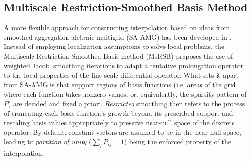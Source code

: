\subsection{Multiscale Restriction-Smoothed Basis Method}
\label{subsec:related_work_msrsb}

A more flexible approach for constructing interpolation based on ideas from smoothed aggregation alebraic multigrid (SA-AMG) has been developed in \cite{Moyner2016}.   Instead of employing localization assumptions to solve local problems, the Multiscale Restriction-Smoothed Basis method (MsRSB) proposes the use of weighted Jacobi smoothing iterations to adapt a tentative prolongation operator to the local properties of the fine-scale differential operator.   What sets it apart from SA-AMG is that support regions of basis functions (i.e. areas of the grid where each function takes nonzero values, or, equivalently, the sparsity pattern of $P$) are decided and fixed a priori. \textit{Restricted} smoothing then refers to the process of truncating each basis function's growth beyond its prescribed support and rescaling basis values appropriately to preserve near-null space of the discrete operator.   By default, constant vectors are assumed to be in the near-null space, leading to \textit{partition of unity} ($\sum_j P_{ij} = 1$) being the enforced property of the interpolation.

